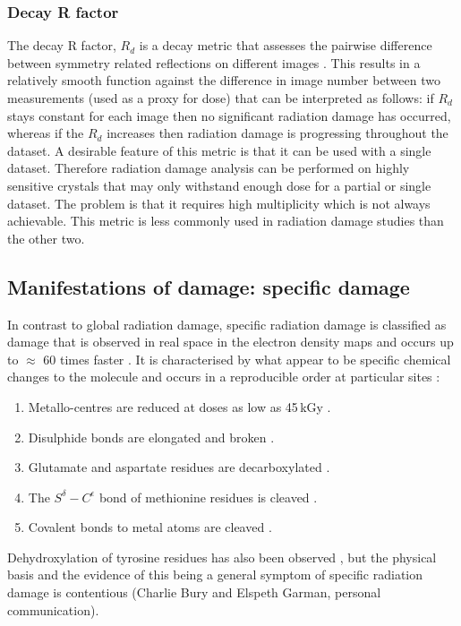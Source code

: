         \subsubsection{Decay R factor}
        \label{subs:Decay R factor}
            The decay R factor, $R_d$ is a decay metric that assesses the pairwise difference between symmetry related reflections on different images \cite{diederichs2006}.
            This results in a relatively smooth function against the difference in image number between two measurements (used as a proxy for dose) that can be interpreted as follows: if $R_d$ stays constant for each image then no significant radiation damage has occurred, whereas if the $R_d$ increases then radiation damage is progressing throughout the dataset.
            A desirable feature of this metric is that it can be used with a single dataset.
            Therefore radiation damage analysis can be performed on highly sensitive crystals that may only withstand enough dose for a partial or single dataset.
			The problem is that it requires high multiplicity which is not always achievable. This metric is less commonly used in radiation damage studies than the other two.

    \subsection{Manifestations of damage: specific damage}
    \label{sub:Manifestations of damage: Specific damage}
        In contrast to global radiation damage, specific radiation damage is classified as damage that is observed in real space in the electron density maps and occurs up to $\approx$ 60 times faster \cite{holton2009}.
        It is characterised by what appear to be specific chemical changes to the molecule and occurs in a reproducible order at particular sites \cite{ravelli2000,weik2000,gerstel2015identifying}:
        \begin{enumerate}
            \item Metallo-centres are reduced at doses as low as 45\,kGy \cite{owen2011revealing}.
            \item Disulphide bonds are elongated and broken \cite{burmeister2000structural,ravelli2000}.
            \item Glutamate and aspartate residues are decarboxylated \cite{burmeister2000structural,weik2000,ravelli2000}.
            \item The $S^{\delta}-C^{\epsilon}$ bond of methionine residues is cleaved \cite{burmeister2000structural}.
            \item Covalent bonds to metal atoms are cleaved \cite{ramagopal2005radiation}.
        \end{enumerate}
        Dehydroxylation of tyrosine residues has also been observed \cite{burmeister2000structural}, but the physical basis and the evidence of this being a general symptom of specific radiation damage is contentious (Charlie Bury and Elspeth Garman, personal communication).


